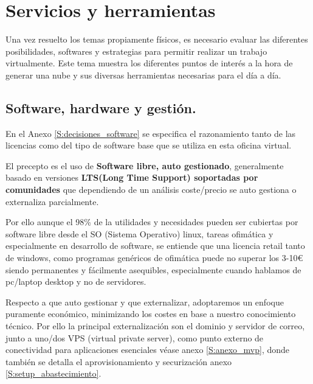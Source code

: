 \chapter{Servicios y herramientas}\label{S:tema_2}
Una vez resuelto los temas propiamente físicos, es necesario evaluar las diferentes posibilidades, softwares y estrategias para permitir realizar un trabajo virtualmente. Este tema muestra los diferentes puntos de interés a la hora de generar una nube y sus diversas herramientas necesarias para el día a día.

\section{Software, hardware y gestión.}
En el Anexo \ref{S:decisiones_software} se especifica el razonamiento tanto de las licencias como del tipo de software base que se utiliza en esta oficina virtual. 

El precepto es el uso de \textbf{Software libre, auto gestionado}, generalmente basado en versiones \textbf{LTS(Long Time Support) soportadas por comunidades} que dependiendo de un análisis coste/precio se auto gestiona o externaliza parcialmente.

Por ello aunque el 98\% de la utilidades y necesidades pueden ser cubiertas por software libre desde el SO (Sistema Operativo) linux, tareas ofimática y especialmente en desarrollo de software, se entiende que una licencia retail tanto de windows, como programas genéricos de ofimática puede no superar los 3-10€ siendo permanentes y fácilmente asequibles, especialmente cuando hablamos de pc/laptop desktop y no de servidores. 


Respecto a que auto gestionar y que externalizar, adoptaremos un enfoque puramente económico, minimizando los costes en base a nuestro conocimiento técnico. Por ello la principal externalización son el dominio y servidor de correo, junto a uno/dos VPS (virtual private server), como punto externo de conectividad para aplicaciones esenciales véase anexo \ref{S:anexo_mvp}, donde también se detalla el aprovisionamiento y securización anexo \ref{S:setup_abastecimiento}.

